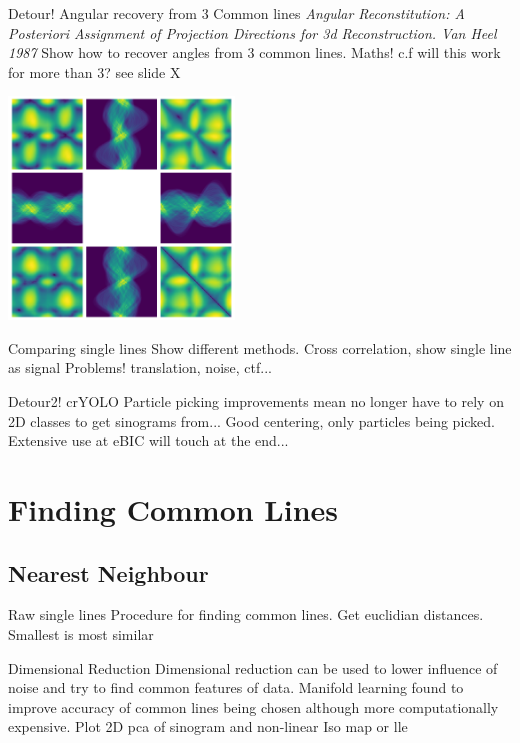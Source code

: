 \documentclass[t, 11pt]{beamer}
\begin{document}
\begin{frame}[fragile]{Detour! Angular recovery from 3 Common lines}
  \textit{\tiny{Angular Reconstitution: A Posteriori Assignment of Projection Directions for 3d Reconstruction. Van Heel 1987}}
  Show how to recover angles from 3 common lines. Maths!
  c.f will this work for more than 3? see slide X
  \begin{center}\includegraphics[width=0.45\textwidth]{images/Sinogram_3_comp.png}
    \end{center}
\end{frame}

\begin{frame}[fragile]{Comparing single lines}
  Show different methods.
  Cross correlation,
  show single line as signal
  Problems! translation, noise, ctf...
\end{frame}

\begin{frame}[fragile]{Detour2! crYOLO}
  Particle picking improvements mean no longer have to rely on 2D classes to get sinograms from...
  Good centering, only particles being picked.
  Extensive use at eBIC will touch at the end...
\end{frame}


\section{Finding Common Lines}
\subsection*{Nearest Neighbour}

\begin{frame}[fragile]{Raw single lines}
  Procedure for finding common lines. Get euclidian distances. Smallest is most similar
\end{frame}

\begin{frame}[fragile]{Dimensional Reduction}
  Dimensional reduction can be used to lower influence of noise and try to find common features of data.
  Manifold learning found to improve accuracy of common lines being chosen although more computationally expensive.
  Plot 2D pca of sinogram
  and non-linear Iso map or lle
\end{frame}
\end{document}
